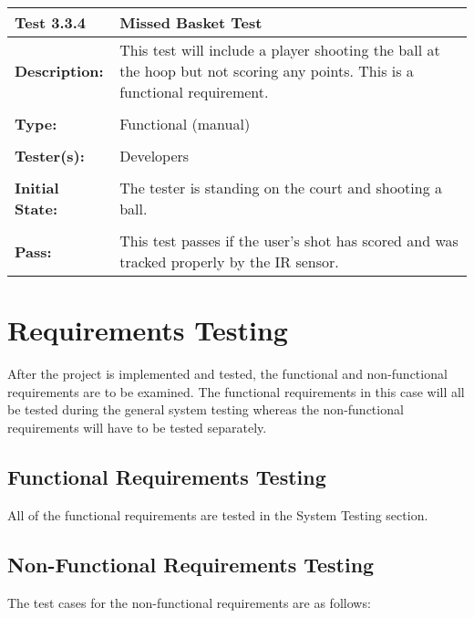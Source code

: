 \documentclass{article}
\begin{document}
\begin{tabularx}{\textwidth}{p{2cm}p{9cm}}
\toprule 
{\bf Test 3.3.4 } & {\bf Missed Basket Test}\\
\midrule
\textbf{Description:} & This test will include a player shooting the ball at the hoop but not scoring any points.  This is a functional requirement. \\[0.3\baselineskip]
                      &                     \\
\textbf{Type:} & Functional (manual)   \\[0.3\baselineskip]
                      &                     \\
\textbf{Tester(s):} & Developers \\[0.3\baselineskip]
                      &                     \\
\textbf{Initial State:} & The tester is standing on the court and shooting a ball. \\[0.3\baselineskip]
                      &                     \\
\textbf{Pass:} & This test passes if the user's shot has scored and was tracked properly by the IR sensor.  \\[0.3\baselineskip]
\bottomrule
\end{tabularx}


\newpage
\section{Requirements Testing}
After the project is implemented and tested, the functional and non-functional requirements are to be examined. The functional requirements in this case will all be tested during the general system testing whereas the non-functional requirements will have to be tested separately.

\subsection{Functional Requirements Testing}
All of the functional requirements are tested in the System Testing section.

\subsection{Non-Functional Requirements Testing}
The test cases for the non-functional requirements are as follows:
\\
\end{document}
